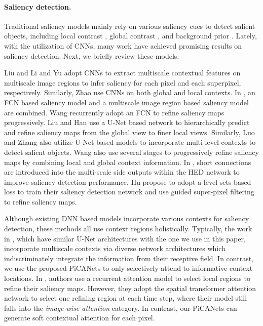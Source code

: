 \documentclass[10pt,twocolumn,letterpaper]{article}
\begin{document}
\paragraph{Saliency detection.}

Traditional saliency models mainly rely on various saliency cues to detect salient objects, including local contrast \cite{klein2011center}, global contrast \cite{cheng2015global}, and background prior \cite{yang2013gbmr}. Lately, with the utilization of CNNs, many work have achieved promising results on saliency detection. Next, we briefly review these models.

Liu \etal \cite{liu2015mrcnn} and Li and Yu \cite{li2015mdf} adopt CNNs to extract multiscale contextual features on multiscale image regions to infer saliency for each pixel and each superpixel, respectively. Similarly, Zhao \etal \cite{zhao2015mcdl} use CNNs on both global and local contexts. In \cite{li2016dcl}, an FCN based saliency model and a multiscale image region based saliency model are combined. Wang \etal \cite{wang2016rfcn} recurrently adopt an FCN to refine saliency maps progressively. Liu and Han \cite{liu2016dhsnet} use a U-Net based network to hierarchically predict and refine saliency maps from the global view to finer local views. Similarly, Luo \etal \cite{luo2017nldf} and Zhang \etal \cite{Zhang2017amulet} also utilize U-Net based models to incorporate multi-level contexts to detect salient objects. Wang \etal \cite{Wang2017srm} also use several stages to progressively refine saliency maps by combining local and global context information. In \cite{hou2017dss}, short connections are introduced into the multi-scale side outputs within the HED network \cite{xie2015hed} to improve saliency detection performance. Hu \etal \cite{hu2017dls} propose to adopt a level sets based loss to train their saliency detection network and use guided super-pixel filtering to refine saliency maps.

Although existing DNN based models incorporate various contexts for saliency detection, these methods all use context regions holistically. Typically, the work in \cite{liu2016dhsnet,luo2017nldf,Zhang2017amulet}, which have similar U-Net architectures with the one we use in this paper, incorporate multiscale contexts via diverse network architectures which indiscriminately integrate the information from their receptive field. In contrast, we use the proposed PiCANets to only selectively attend to informative context locations. In \cite{kuen2016recurrent}, authors use a recurrent attention model to select local regions to refine their saliency maps. However, they adopt the spatial transformer attention network \cite{jaderberg2015stn} to select one refining region at each time step, where their model still falls into the \emph{image-wise attention} category. In contrast, our PiCANets can generate soft contextual attention for each pixel.
\end{document}
